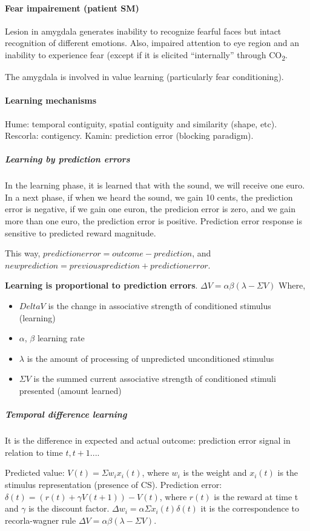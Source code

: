 \documentclass[12pt,article,oneside,a4paper]{memoir}
\begin{document}
\paragraph{Fear impairement (patient SM)}
Lesion in amygdala generates inability to recognize fearful faces but intact
recognition of different emotions. Also, impaired attention to eye region and an
inability to experience fear (except if it is elicited ``internally'' through
CO\textsubscript{2}.

The amygdala is involved in value learning (particularly fear conditioning).

\paragraph{Learning mechanisms}
Hume: temporal contiguity, spatial contiguity and similarity (shape, etc).
Rescorla: contigency.
Kamin: prediction error (blocking paradigm).

\subparagraph{Learning by prediction errors}
In the learning phase, it is learned that with the sound, we will receive one
euro. In a next phase, if when we heard the sound, we gain 10 cents, the
prediction error is negative, if we gain one euron, the predicion error is zero,
and we gain more than one euro, the prediction error is positive.
Prediction error response is sensitive to predicted reward magnitude.

This way, $prediction error = outcome - prediction$, and $new prediction = 
previous prediction + prediction error$.

\textbf{Learning is proportional to prediction errors}.
$\Delta V = \alpha \beta (\lambda - \Sigma V)$
Where, 
\begin{itemize}
\item $Delta V$ is the change in associative strength of conditioned stimulus
(learning)
\item $\alpha$, $\beta$ learning rate
\item $\lambda$ is the amount of processing of unpredicted unconditioned stimulus
\item $\Sigma V$ is the summed current associative strength of conditioned
stimuli presented (amount learned)
\end{itemize}

\subparagraph{Temporal difference learning}
It is the difference in expected and actual outcome: prediction error signal in
relation to time $t, t+1...$.

Predicted value: $V(t) = \Sigma w_{i} x_{i}(t)$, where $w_{i}$ is the weight
and $x_{i}(t)$ is the stimulus representation (presence of CS).
Prediction error: $\delta(t) = (r(t) + \gamma V(t+1)) - V(t)$, where $r(t)$ is
the reward at time t and $\gamma$ is the discount factor.
$\Delta w_{i} = \alpha \Sigma x_{i}(t) \delta(t)$ it is the correspondence to
recorla-wagner rule $\Delta V = \alpha \beta (\lambda - \Sigma V)$.
\end{document}
